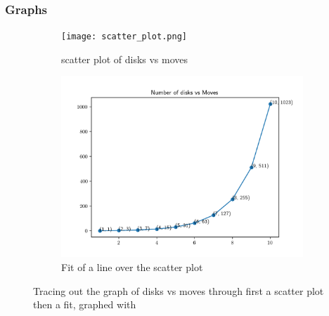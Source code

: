 \documentclass[12pt,a4paper]{article}
\begin{document}
	\subsubsection{Graphs}
	\begin{figure}[ht!]
		\begin{subfigure}{.55\textwidth}
			\texttt{[image: scatter\_plot.png]}
			\caption{scatter plot of disks vs moves}
			\label{fig:fig1}
		\end{subfigure}%
		\begin{subfigure}{.55\textwidth}
			\includegraphics[width=\linewidth]{Figure_1}
			\caption{Fit of a line over the scatter plot}
			\label{fig:sfig2}
		\end{subfigure}
	\caption{Tracing out the graph of disks vs moves through first a scatter plot then a fit, graphed with \cite{matplotlib}}
	\label{fig1:fig1}
	\end{figure}
\end{document}

